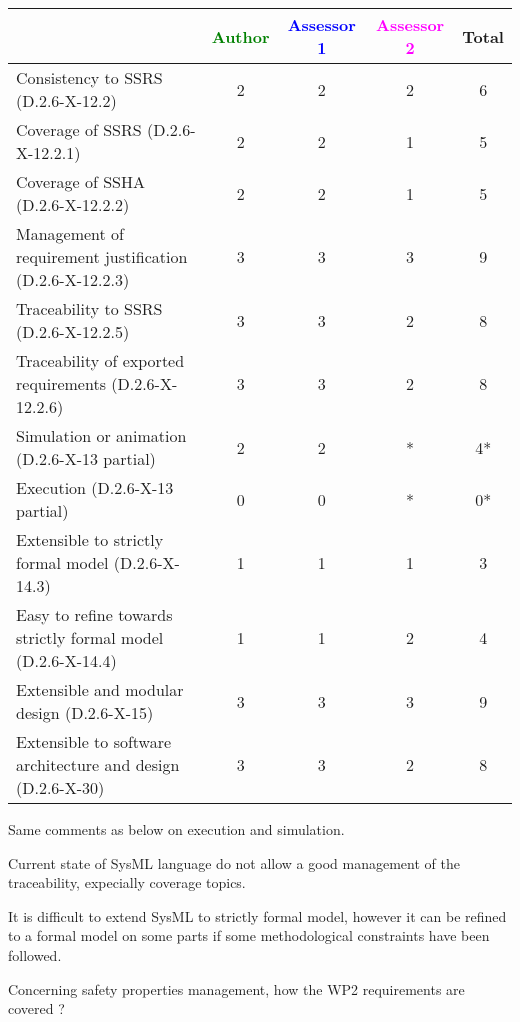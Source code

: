 \begin{tabular}{|l | c | c | c | c|}
\hline
& \textcolor{green}{Author} & \textcolor{blue}{Assessor 1} & \textcolor{magenta}{Assessor 2} & Total \\
\hline
Consistency to SSRS (D.2.6-X-12.2) & 2 & 2 & 2 & 6 \\
\hline
Coverage of SSRS (D.2.6-X-12.2.1) & 2 & 2 & 1 & 5 \\
\hline
Coverage of SSHA (D.2.6-X-12.2.2) & 2 & 2 & 1 & 5 \\
\hline
Management of requirement justification (D.2.6-X-12.2.3) & 3 & 3 & 3 & 9 \\
\hline
Traceability to SSRS (D.2.6-X-12.2.5) & 3 & 3 & 2 & 8 \\
\hline
Traceability of exported requirements (D.2.6-X-12.2.6) & 3 & 3 & 2 & 8 \\
\hline
Simulation or animation (D.2.6-X-13 partial) & 2 & 2 &  * & 4* \\
\hline
Execution (D.2.6-X-13 partial) & 0 & 0 & * & 0* \\
\hline
Extensible to strictly formal model (D.2.6-X-14.3) & 1 & 1 & 1 & 3 \\
\hline
Easy to refine towards strictly formal model (D.2.6-X-14.4) & 1 & 1 & 2 & 4 \\
\hline
Extensible and modular design (D.2.6-X-15) & 3 & 3 & 3 & 9 \\
\hline
Extensible to software architecture and design (D.2.6-X-30) & 3 & 3 & 2 & 8 \\
\hline
\end{tabular}



\begin{assessor2}
Same comments as below on execution and simulation.

Current state of SysML language do not allow a good management of the traceability, expecially coverage topics.

It is difficult to extend SysML to strictly formal model, however it can be refined to a formal model on some parts if some methodological constraints have been followed.
\end{assessor2}

Concerning safety properties management, how the WP2 requirements are covered ?


